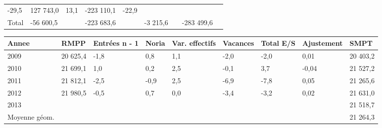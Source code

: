 \begin{longtable}[]{@{}lllllllll@{}}
\begin{minipage}[t]{0.06\columnwidth}
-29,5\strut
\end{minipage} & \begin{minipage}[t]{0.12\columnwidth}\raggedright
127 743,0\strut
\end{minipage} & \begin{minipage}[t]{0.06\columnwidth}\raggedright
13,1\strut
\end{minipage} & \begin{minipage}[t]{0.09\columnwidth}\raggedright
-223 110,1\strut
\end{minipage} & \begin{minipage}[t]{0.06\columnwidth}\raggedright
-22,9\strut
\end{minipage}\tabularnewline
\begin{minipage}[t]{0.05\columnwidth}\raggedright
Total\strut
\end{minipage} & \begin{minipage}[t]{0.10\columnwidth}\raggedright
-56 600,5\strut
\end{minipage} & \begin{minipage}[t]{0.06\columnwidth}\raggedright
\strut
\end{minipage} & \begin{minipage}[t]{0.16\columnwidth}\raggedright
-223 683,6\strut
\end{minipage} & \begin{minipage}[t]{0.06\columnwidth}\raggedright
\strut
\end{minipage} & \begin{minipage}[t]{0.12\columnwidth}\raggedright
-3 215,6\strut
\end{minipage} & \begin{minipage}[t]{0.06\columnwidth}\raggedright
\strut
\end{minipage} & \begin{minipage}[t]{0.09\columnwidth}\raggedright
-283 499,6\strut
\end{minipage} & \begin{minipage}[t]{0.06\columnwidth}\raggedright
\strut
\end{minipage}\tabularnewline
\bottomrule
\end{longtable}

\begin{longtable}[]{@{}lllllllll@{}}
\toprule
Annee & RMPP & Entrées n - 1 & Noria & Var. effectifs & Vacances & Total
E/S & Ajustement & SMPT\tabularnewline
\midrule
\endhead
2009 & 20 625,4 & -1,8 & 0,8 & 1,1 & -2,0 & -2,0 & 0,01 & 20
403,2\tabularnewline
2010 & 21 699,1 & 1,0 & 0,2 & 2,5 & -0,1 & 3,7 & -0,04 & 21
527,2\tabularnewline
2011 & 21 812,1 & -2,5 & -0,9 & 2,5 & -6,9 & -7,8 & 0,05 & 21
265,6\tabularnewline
2012 & 21 980,5 & -0,5 & 0,7 & 0,0 & -3,4 & -3,2 & 0,02 & 21
631,0\tabularnewline
2013 & & & & & & & & 21 518,7\tabularnewline
Moyenne géom. & & & & & & & & 21 264,3\tabularnewline
\bottomrule
\end{longtable}

